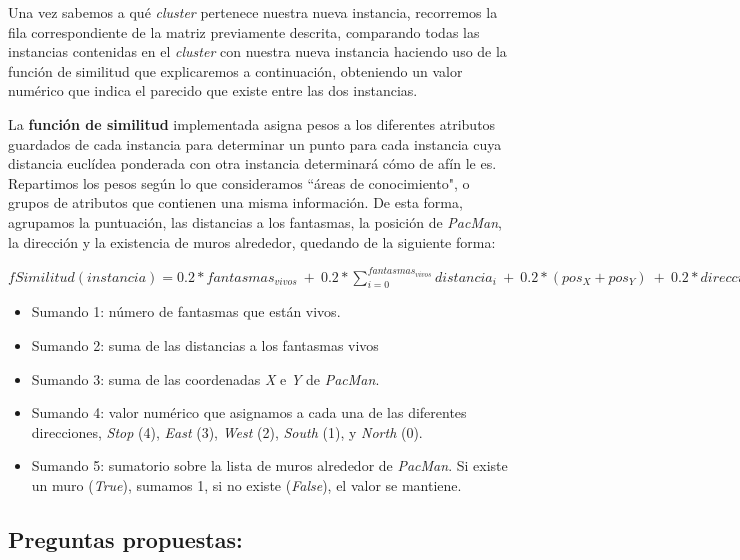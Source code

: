 \documentclass[12pt]{article}
\begin{document}
Una vez sabemos a qué \textit{cluster} pertenece nuestra nueva instancia, recorremos la fila correspondiente de la matriz previamente descrita, comparando todas las instancias contenidas en el \textit{cluster} con nuestra nueva instancia haciendo uso de la función de similitud que explicaremos a continuación, obteniendo un valor numérico que indica el parecido que existe entre las dos instancias.


La \textbf{función de similitud} implementada asigna pesos a los diferentes atributos guardados de cada instancia para determinar un punto para cada instancia cuya distancia euclídea ponderada con otra instancia determinará cómo de afín le es. Repartimos los pesos según lo que consideramos ``áreas de conocimiento", o grupos de atributos que contienen una misma información. De esta forma, agrupamos la puntuación, las distancias a los fantasmas, la posición de \textit{PacMan}, la dirección y la existencia de muros alrededor, quedando de la siguiente forma:
\begin{center}
    $ fSimilitud(instancia) = 0.2 * fantasmas_{vivos}\ +\ 0.2 * \sum\limits_{i = 0}^{fantasmas_{vivos}} distancia_i\ +\ 0.2 *  (pos_X + pos_Y)\ +\ 0.2 * direccion\ +\ 0.2 * \sum\limits_{i = 0}^{dimension_{tablero}} hayMuro_i $
\end{center}

\begin{itemize}
    \item Sumando 1: número de fantasmas que están vivos.
    \item Sumando 2: suma de las distancias a los fantasmas vivos
    \item Sumando 3: suma de las coordenadas \textit{X} e \textit{Y} de \textit{PacMan}.
    \item Sumando 4: valor numérico que asignamos a cada una de las diferentes direcciones, \textit{Stop} (4), \textit{East} (3), \textit{West} (2), \textit{South} (1), y \textit{North} (0).
    \item Sumando 5: sumatorio sobre la lista de muros alrededor de \textit{PacMan}. Si existe un muro (\textit{True}), sumamos 1, si no existe (\textit{False}), el valor se mantiene.
\end{itemize}

\newpage
\subsection{Preguntas propuestas:}
\end{document}
